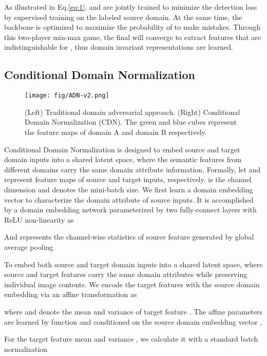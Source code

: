 \documentclass[runningheads]{llncs}
\begin{document}
As illustrated in Eq.\ref{eq:1},  and  are jointly trained to minimize the detection loss  by supervised training on the labeled source domain.
At the same time, the backbone  is optimized to maximize the probability of  to make mistakes.
Through this two-player min-max game, the final  will
converge to extract features that are indistinguishable for , thus domain invariant representations are learned.


\subsection{Conditional Domain Normalization} \label{sec: 3.2}

\begin{figure}[!t]
    \centering
    \texttt{[image: fig/ADN-v2.png]}
    \caption{(Left) Traditional domain adversarial approach. (Right) Conditional Domain Normalization (CDN).
    The green and blue cubes represent the feature maps of domain A and domain B respectively.
    }
    \label{fig:CDN}
\end{figure}

Conditional Domain Normalization is designed to embed source and target domain inputs into a shared latent space, where
the semantic features from different domains carry the same domain attribute information.
Formally, let  and  represent feature maps of source and target inputs, respectively.
 is the channel dimension and  denotes the mini-batch size.
We first learn a domain embedding vector  to characterize the domain attribute of source inputs.
It is accomplished by a domain embedding network  parameterized by two fully-connect layers with ReLU non-linearity  as

And  represents the channel-wise statistics of source feature  generated by global average pooling


To embed both source and target domain inputs into a shared latent space, where source and target features carry the same domain attributes while preserving individual image contents.
We encode the target features  with the source domain embedding via an affine transformation  as

where  and  denote the mean and variance of target feature .
The affine parameters are learned by function  and  conditioned on the source domain embedding vector ,



For the target feature mean   and variance  , we calculate it with a standard batch normalization~\cite{ioffe2015batch}
\end{document}

